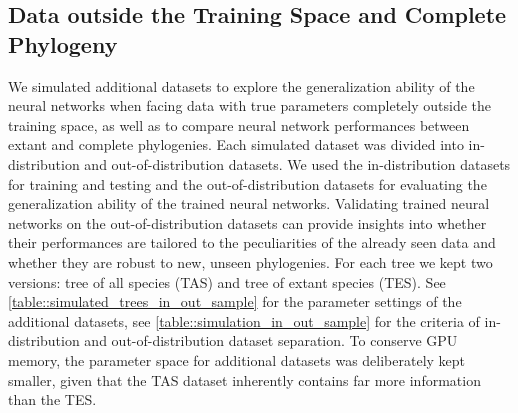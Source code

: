 {\subsection{Data outside the Training Space and Complete Phylogeny}
\label{appendix::generalization_full_tree}
We simulated additional datasets to explore the generalization ability of the neural networks when facing data with true parameters completely outside the training space, as well as to compare neural network performances between extant and complete phylogenies. Each simulated dataset was divided into in-distribution and out-of-distribution datasets. We used the in-distribution datasets for training and testing and the out-of-distribution datasets for evaluating the generalization ability of the trained neural networks. Validating trained neural networks on the out-of-distribution datasets can provide insights into whether their performances are tailored to the peculiarities of the already seen data and whether they are robust to new, unseen phylogenies. For each tree we kept two versions: tree of all species (TAS) and tree of extant species (TES). See \autoref{table::simulated_trees_in_out_sample} for the parameter settings of the additional datasets, see \autoref{table::simulation_in_out_sample} for the criteria of in-distribution and out-of-distribution dataset separation. To conserve GPU memory, the parameter space for additional datasets was deliberately kept smaller, given that the TAS dataset inherently contains far more information than the TES.

}
